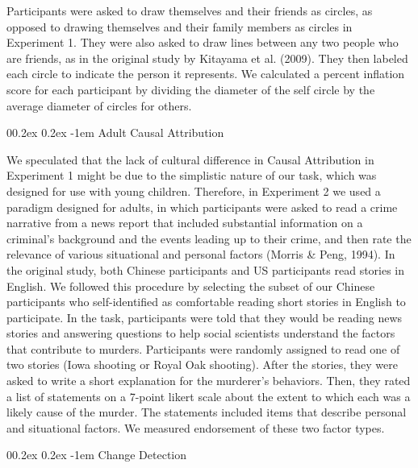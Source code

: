 \documentclass[
  man]{apa6}
\makeatletter
\let\oldparagraph\paragraph
\renewcommand{\paragraph}[1]{\oldparagraph{#1}\mbox{}}
\renewcommand{\paragraph}{\@startsection{paragraph}{4}{\parindent}%
  {0\baselineskip \@plus 0.2ex \@minus 0.2ex}%
  {-1em}%
  {\normalfont\normalsize\bfseries\itshape\typesectitle}}
\makeatother
\begin{document}
Participants were asked to draw themselves and their friends as circles, as opposed to drawing themselves and their family members as circles in Experiment 1. They were also asked to draw lines between any two people who are friends, as in the original study by Kitayama et al. (2009). They then labeled each circle to indicate the person it represents. We calculated a percent inflation score for each participant by dividing the diameter of the self circle by the average diameter of circles for others.

\hypertarget{adult-causal-attribution}{%
\paragraph{Adult Causal Attribution}\label{adult-causal-attribution}}

We speculated that the lack of cultural difference in Causal Attribution in Experiment 1 might be due to the simplistic nature of our task, which was designed for use with young children. Therefore, in Experiment 2 we used a paradigm designed for adults, in which participants were asked to read a crime narrative from a news report that included substantial information on a criminal's background and the events leading up to their crime, and then rate the relevance of various situational and personal factors (Morris \& Peng, 1994). In the original study, both Chinese participants and US participants read stories in English. We followed this procedure by selecting the subset of our Chinese participants who self-identified as comfortable reading short stories in English to participate. In the task, participants were told that they would be reading news stories and answering questions to help social scientists understand the factors that contribute to murders. Participants were randomly assigned to read one of two stories (Iowa shooting or Royal Oak shooting). After the stories, they were asked to write a short explanation for the murderer's behaviors. Then, they rated a list of statements on a 7-point likert scale about the extent to which each was a likely cause of the murder. The statements included items that describe personal and situational factors. We measured endorsement of these two factor types.

\hypertarget{change-detection}{%
\paragraph{Change Detection}\label{change-detection}}
\end{document}
